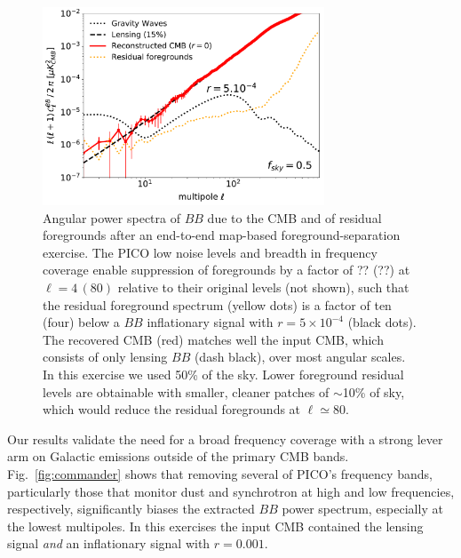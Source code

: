 \documentclass[PICOReport.tex]{subfiles}
\begin{document}
\begin{figure}
\hspace{0.in}
\parbox{3.0in}{\centerline {
\includegraphics[width=3.3in]{images/gnilc_pico_90p92_r0_AL0p15_mc_test3_final.pdf}}}
\hspace{0.2in}
\parbox{3.2in}{
\caption{\captiontext Angular power spectra of $BB$ due to the CMB and of residual foregrounds after an end-to-end map-based foreground-separation exercise. The PICO low noise levels and breadth in frequency coverage enable suppression of foregrounds by a factor of ?? (??) at $\ell=4\, (80)$ relative to their original levels (not shown), such that the residual foreground  spectrum  (yellow dots) is a factor of ten (four) below a $BB$ inflationary signal with $r=5\times10^{-4}$ (black dots). The recovered CMB (red) matches well the input CMB, which consists of only lensing $BB$ (dash black), over most angular scales. In this exercise we used 50\% of the sky.  Lower foreground residual levels are obtainable with smaller, cleaner patches of $\sim$10\% of sky, which would reduce the residual foregrounds at $\ell \simeq 80$. 
\label{fig:nilc} } }
\vspace{-0.1in}
\end{figure}

Our results validate the need for a broad frequency coverage with a strong lever arm on Galactic emissions outside of the primary CMB bands. Fig.~\ref{fig:commander} shows that removing several of PICO's frequency bands, particularly those that monitor dust and synchrotron at high and low frequencies, respectively, significantly biases the extracted $BB$ power spectrum, especially at the lowest multipoles. In this exercises the input CMB contained the lensing signal {\it and} an inflationary signal with $r=0.001$.  
\end{document}
